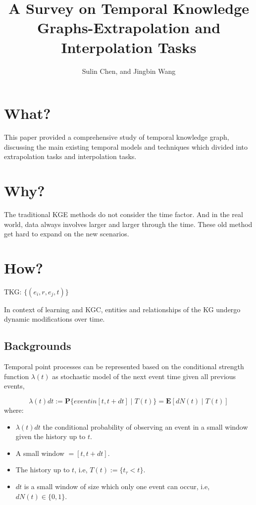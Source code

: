 \documentclass[12pt]{article}
\begin{document}
\title{A Survey on Temporal Knowledge Graphs-Extrapolation and Interpolation Tasks}
\author{Sulin Chen, and Jingbin Wang}
\maketitle

\section{What?}

This paper provided a comprehensive study of temporal knowledge graph, discussing the main existing temporal models and techniques
which divided into extrapolation tasks and interpolation tasks. 

\section{Why?}

The traditional KGE methods do not consider the time factor. And in the real world, data always involves larger and larger 
through the time. These old method get hard to expand on the new scenarios.

\section{How?}

TKG: $\{(e_i, r, e_j, t)\}$

In context of learning and KGC, entities and relationships of the KG undergo dynamic modifications over time.


\subsection{Backgrounds}

Temporal point processes can be represented based on the conditional strength function $\lambda(t)$ as stochastic model of the 
next event time given all previous events,

\begin{equation}
    \lambda(t)dt := \mathbf{P}\{eventin[t, t + dt] \mid T(t)\} = \mathbf{E}[dN(t) \mid T(t)]
\end{equation}
where:
\begin{itemize}
    \item $\lambda(t)dt$ the conditional probability of observing an event in a small window given the history up to $t$.
    \item A small window $ = [t, t + dt]$.
    \item The history up to $t$, i.e, $T(t) := \{t_{\tau} < t\}$.
    \item $dt$ is a small window of size which only one event can occur, i.e, $dN(t) \in \{0, 1\}$.
\end{itemize}
\end{document}

